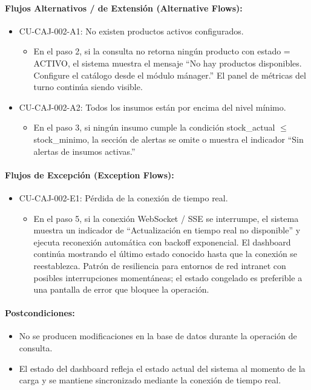 \paragraph{Flujos Alternativos / de Extensión (Alternative Flows):}
\begin{itemize}
    \item CU-CAJ-002-A1: No existen productos activos configurados.
    \begin{itemize}
        \item En el paso 2, si la consulta no retorna ningún producto con estado = ACTIVO, el sistema muestra el mensaje ``No hay productos disponibles. Configure el catálogo desde el módulo mánager.'' El panel de métricas del turno continúa siendo visible.
    \end{itemize}
    \item CU-CAJ-002-A2: Todos los insumos están por encima del nivel mínimo.
    \begin{itemize}
        \item En el paso 3, si ningún insumo cumple la condición stock\_actual $\le$ stock\_minimo, la sección de alertas se omite o muestra el indicador ``Sin alertas de insumos activas.''
    \end{itemize}
\end{itemize}

\paragraph{Flujos de Excepción (Exception Flows):}
\begin{itemize}
    \item CU-CAJ-002-E1: Pérdida de la conexión de tiempo real.
    \begin{itemize}
        \item En el paso 5, si la conexión WebSocket / SSE se interrumpe, el sistema muestra un indicador de ``Actualización en tiempo real no disponible'' y ejecuta reconexión automática con backoff exponencial. El dashboard continúa mostrando el último estado conocido hasta que la conexión se reestablezca. Patrón de resiliencia para entornos de red intranet con posibles interrupciones momentáneas; el estado congelado es preferible a una pantalla de error que bloquee la operación.
    \end{itemize}
\end{itemize}

\paragraph{Postcondiciones:}
\begin{itemize}
    \item No se producen modificaciones en la base de datos durante la operación de consulta.
    \item El estado del dashboard refleja el estado actual del sistema al momento de la carga y se mantiene sincronizado mediante la conexión de tiempo real.
\end{itemize}

